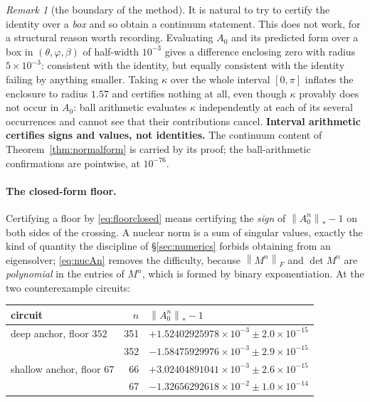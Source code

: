 \documentclass[11pt,a4paper]{article}
\theoremstyle{definition}
\theoremstyle{remark}
\newtheorem{remark}[theorem]{Remark}
\newcommand{\nuc}[1]{\left\lVert #1 \right\rVert_{*}}
\newcommand{\Frob}[1]{\left\lVert #1 \right\rVert_{F}}
\begin{document}
\begin{remark}[the boundary of the method]\label{rem:boundary}
It is natural to try to certify the identity over a \emph{box} and so obtain a continuum statement. This does not work, for a structural reason worth recording. Evaluating $A_0$ and its predicted form over a box in $(\theta,\varphi,\beta)$ of half-width $10^{-3}$ gives a difference enclosing zero with radius $5\times10^{-3}$: consistent with the identity, but equally consistent with the identity failing by anything smaller. Taking $\kappa$ over the whole interval $[0,\pi]$ inflates the enclosure to radius $1.57$ and certifies nothing at all, even though $\kappa$ provably does not occur in $A_0$: ball arithmetic evaluates $\kappa$ independently at each of its several occurrences and cannot see that their contributions cancel. \textbf{Interval arithmetic certifies signs and values, not identities.} The continuum content of Theorem~\ref{thm:normalform} is carried by its proof; the ball-arithmetic confirmations are pointwise, at $10^{-76}$.
\end{remark}

\paragraph{The closed-form floor.} Certifying a floor by \eqref{eq:floorclosed} means certifying the \emph{sign} of $\nuc{A_0^n} - 1$ on both sides of the crossing. A nuclear norm is a sum of singular values, exactly the kind of quantity the discipline of \S\ref{sec:numerics} forbids obtaining from an eigensolver; \eqref{eq:nucAn} removes the difficulty, because $\Frob{M^n}$ and $\det M^n$ are \emph{polynomial} in the entries of $M^n$, which is formed by binary exponentiation. At the two counterexample circuits:

\begin{center}
\begin{tabular}{lrl}
\toprule
circuit & $n$ & $\nuc{A_0^n} - 1$\\
\midrule
deep anchor, floor $352$ & 351 & $+1.52402925978\times10^{-3} \pm 2.0\times10^{-15}$\\
                          & 352 & $-1.58475929976\times10^{-3} \pm 2.9\times10^{-15}$\\
shallow anchor, floor $67$ & 66 & $+3.02404891041\times10^{-3} \pm 2.6\times10^{-15}$\\
                          & 67 & $-1.32656292618\times10^{-2} \pm 1.0\times10^{-14}$\\
\bottomrule
\end{tabular}
\end{center}
\end{document}
